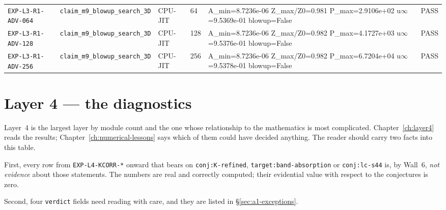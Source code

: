 {\begin{longtable}{@{}>{\raggedright\arraybackslash}p{} >{\raggedright\arraybackslash}p{} l l >{\raggedright\arraybackslash}p{} l@{}}
\texttt{EXP-\allowbreak{}L3-\allowbreak{}R1-\allowbreak{}ADV-\allowbreak{}064} & \texttt{claim\_\allowbreak{}m9\_\allowbreak{}blowup\_\allowbreak{}search\_\allowbreak{}3D} & CPU-\allowbreak{}JIT & 64 & A\_\allowbreak{}min=\allowbreak{}8.7236e-06  Z\_\allowbreak{}max/Z0=\allowbreak{}0.981  P\_\allowbreak{}max=\allowbreak{}2.9106e+02  u$\infty$=\allowbreak{}9.5369e-01  blowup=\allowbreak{}False & \textsf{PASS}\\
\texttt{EXP-\allowbreak{}L3-\allowbreak{}R1-\allowbreak{}ADV-\allowbreak{}128} & \texttt{claim\_\allowbreak{}m9\_\allowbreak{}blowup\_\allowbreak{}search\_\allowbreak{}3D} & CPU-\allowbreak{}JIT & 128 & A\_\allowbreak{}min=\allowbreak{}8.7236e-06  Z\_\allowbreak{}max/Z0=\allowbreak{}0.982  P\_\allowbreak{}max=\allowbreak{}4.1727e+03  u$\infty$=\allowbreak{}9.5376e-01  blowup=\allowbreak{}False & \textsf{PASS}\\
\texttt{EXP-\allowbreak{}L3-\allowbreak{}R1-\allowbreak{}ADV-\allowbreak{}256} & \texttt{claim\_\allowbreak{}m9\_\allowbreak{}blowup\_\allowbreak{}search\_\allowbreak{}3D} & CPU-\allowbreak{}JIT & 256 & A\_\allowbreak{}min=\allowbreak{}8.7236e-06  Z\_\allowbreak{}max/Z0=\allowbreak{}0.982  P\_\allowbreak{}max=\allowbreak{}6.7204e+04  u$\infty$=\allowbreak{}9.5378e-01  blowup=\allowbreak{}False & \textsf{PASS}\\
\end{longtable}}

\section{Layer 4 --- the diagnostics}
\label{sec:a1-l4}

Layer~4 is the largest layer by module count and the one whose relationship to
the mathematics is most complicated. Chapter~\ref{ch:layer4} reads the results;
Chapter~\ref{ch:numerical-lessons} says which of them could have decided
anything. The reader should carry two facts into this table.

First, every row from \texttt{EXP-L4-KCORR-*} onward that bears on
\texttt{conj:K-refined}, \texttt{target:band-absorption} or
\texttt{conj:lc-s44} is, by Wall~6, \emph{not evidence} about those
statements. The numbers are real and correctly computed; their evidential
value with respect to the conjectures is zero.

Second, four \texttt{verdict} fields need reading with care, and they are
listed in \S\ref{sec:a1-exceptions}.

